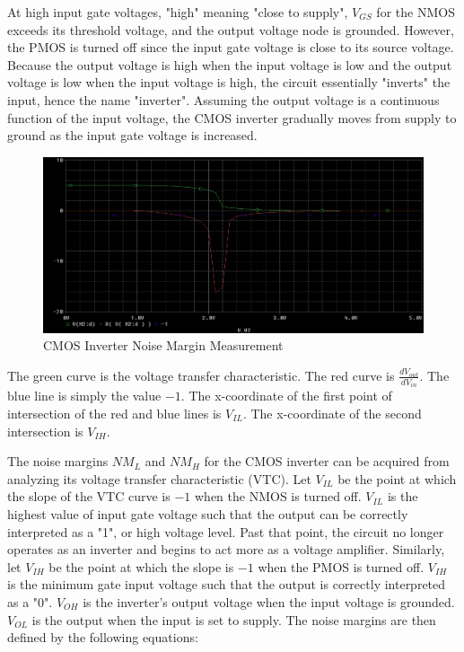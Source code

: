 At high input gate voltages, "high" meaning "close to supply", $V_{GS}$ for the NMOS exceeds its threshold voltage, and the output voltage node is grounded. However, the PMOS is turned off since the input gate voltage is close to its source voltage. Because the output voltage is high when the input voltage is low and the output voltage is low when the input voltage is high, the circuit essentially "inverts" the input, hence the name "inverter". Assuming the output voltage is a continuous function of the input voltage, the CMOS inverter gradually moves from supply to ground as the input gate voltage is increased. \\

\FloatBarrier

\begin{figure}[h!]
	\centering
	\includegraphics[scale=0.75]{../images/circuit1_noisemargin_measure.PNG}
	\caption{CMOS Inverter Noise Margin Measurement}
	\label{fig:circuit1_noisemargin_measure}
\end{figure}

\FloatBarrier

{\footnotesize The green curve is the voltage transfer characteristic. The red curve is $\frac{dV_{out}}{dV_{in}}$. The blue line is simply the value $-1$. The x-coordinate of the first point of intersection of the red and blue lines is $V_{IL}$. The x-coordinate of the second intersection is $V_{IH}$.}

\FloatBarrier

The noise margins $NM_{L}$ and $NM_{H}$ for the CMOS inverter can be acquired from analyzing its voltage transfer characteristic (VTC). Let $V_{IL}$ be the point at which the slope of the VTC curve is $-1$ when the NMOS is turned off. $V_{IL}$ is the highest value of input gate voltage such that the output can be correctly interpreted as a "1", or high voltage level. Past that point, the circuit no longer operates as an inverter and begins to act more as a voltage amplifier. Similarly, let $V_{IH}$ be the point at which the slope is $-1$ when the PMOS is turned off. $V_{IH}$ is the minimum gate input voltage such that the output is correctly interpreted as a "0". $V_{OH}$ is the inverter's output voltage when the input voltage is grounded. $V_{OL}$ is the output when the input is set to supply. The noise margins are then defined by the following equations:


